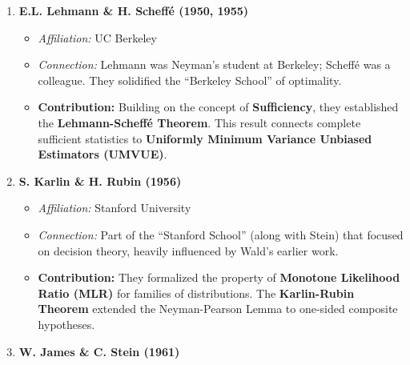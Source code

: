 \documentclass[
  letterpaper,
  DIV=11,
  numbers=noendperiod]{scrreprt}
\providecommand{\tightlist}{%
  \setlength{\itemsep}{0pt}\setlength{\parskip}{0pt}}
\renewcommand{\[}{\begin{equation}}
\renewcommand{\]}{\end{equation}}
\theoremstyle{definition}
\theoremstyle{plain}
\theoremstyle{plain}
\theoremstyle{plain}
\theoremstyle{definition}
\theoremstyle{plain}
\theoremstyle{remark}
\begin{document}
\begin{enumerate}
  \begin{itemize}
  \tightlist
  \item
    \emph{Affiliation:} Indian Statistical Institute (ISI)
  \item
    \emph{Connection:} A PhD student of Fisher at Cambridge; he unified
    the testing theories of Fisher, Neyman, and Wald.
  \item
    \textbf{Contribution:} Rao introduced the \textbf{Score Test} (or
    Lagrange Multiplier Test), which allows for hypothesis testing using
    only the restricted MLE (under the null hypothesis). He also
    independently derived the lower bound for estimator variance.
  \end{itemize}
\item
  \textbf{E.L. Lehmann \& H. Scheffé (1950, 1955)}

  \begin{itemize}
  \tightlist
  \item
    \emph{Affiliation:} UC Berkeley
  \item
    \emph{Connection:} Lehmann was Neyman's student at Berkeley; Scheffé
    was a colleague. They solidified the ``Berkeley School'' of
    optimality.
  \item
    \textbf{Contribution:} Building on the concept of
    \textbf{Sufficiency}, they established the \textbf{Lehmann-Scheffé
    Theorem}. This result connects complete sufficient statistics to
    \textbf{Uniformly Minimum Variance Unbiased Estimators (UMVUE)}.
  \end{itemize}
\item
  \textbf{S. Karlin \& H. Rubin (1956)}

  \begin{itemize}
  \tightlist
  \item
    \emph{Affiliation:} Stanford University
  \item
    \emph{Connection:} Part of the ``Stanford School'' (along with
    Stein) that focused on decision theory, heavily influenced by Wald's
    earlier work.
  \item
    \textbf{Contribution:} They formalized the property of
    \textbf{Monotone Likelihood Ratio (MLR)} for families of
    distributions. The \textbf{Karlin-Rubin Theorem} extended the
    Neyman-Pearson Lemma to one-sided composite hypotheses.
  \end{itemize}
\item
  \textbf{W. James \& C. Stein (1961)}


\end{enumerate}
\end{document}
